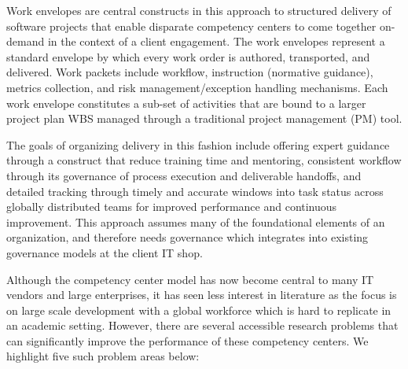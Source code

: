 Work envelopes are central constructs in this approach to structured delivery of software projects that enable disparate competency centers to come together on-demand in the context of a client engagement.  The work envelopes represent a standard envelope by which every work order is authored, transported, and delivered. Work packets include workflow, instruction (normative guidance), metrics collection, and risk management/exception handling mechanisms. Each work envelope constitutes a sub-set of activities that are bound to a larger project plan WBS managed through a traditional project management (PM) tool.

The goals of organizing delivery in this fashion include offering expert guidance through a construct that reduce training time and mentoring, consistent workflow through its governance of process execution and deliverable handoffs, and detailed tracking through timely and accurate windows into task status across globally distributed teams for improved performance and continuous improvement. This approach assumes many of the foundational elements of an organization, and therefore needs governance which integrates into existing governance models at the client IT shop.

Although the competency center model has now become central to many IT vendors and large enterprises, it has seen less interest in literature as the focus is on large scale development with a global workforce which is hard to replicate in an academic setting. However, there are several accessible research problems that can significantly improve the performance of these competency centers. We highlight five such problem areas below:

